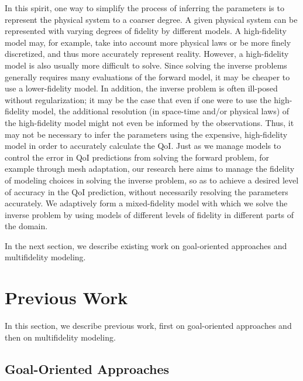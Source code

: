 In this spirit, one way to simplify the process of inferring the parameters is to represent the physical system to a coarser degree. A given physical system can be represented with varying degrees of fidelity by different models. A high-fidelity model may, for example, take into account more physical laws or be more finely discretized, and thus more accurately represent reality. However, a high-fidelity model is also usually more difficult to solve. Since solving the inverse problems generally requires many evaluations of the forward model, it may be cheaper to use a lower-fidelity model. In addition, the inverse problem is often ill-posed without regularization; it may be the case that even if one were to use the high-fidelity model, the additional resolution (in space-time and/or physical laws) of the high-fidelity model might not even be informed by the observations. Thus, it may not be necessary to infer the parameters using the expensive, high-fidelity model in order to accurately calculate the QoI. Just as we manage models to control the error in QoI predictions from solving the forward problem, for example through mesh adaptation, our research here aims to manage the fidelity of modeling choices in solving the inverse problem, so as to achieve a desired level of accuracy in the QoI prediction, without necessarily resolving the parameters accurately. We adaptively form a mixed-fidelity model with which we solve the inverse problem by using models of different levels of fidelity in different parts of the domain.

In the next section, we describe existing work on goal-oriented approaches and multifidelity modeling.

\section{Previous Work}  %

In this section, we describe previous work, first on goal-oriented approaches and then on multifidelity modeling.

\subsection{Goal-Oriented Approaches}

